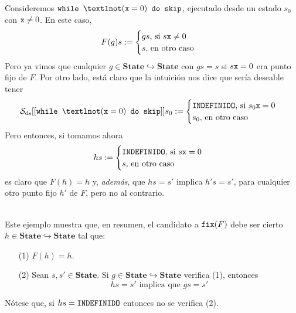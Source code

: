 \begin{example}
Consideremos $\n{while } ¬(\n{x}=0)\n{ do skip}$, ejecutado desde un estado $s_0$ con $\texttt{x}\neq 0$. En este caso, 
$$F(g)s := \begin{cases}
    gs \text{, si } s\texttt{x} \neq 0\\
    s \text{, en otro caso}
\end{cases}$$
Pero ya vimos que cualquier $g \in \mathbf{State}\hookrightarrow\mathbf{State}$ con $gs = s$ si $s\texttt{x} = 0$ era punto fijo de $F$. Por otro lado, está claro que la intuición nos dice que sería deseable tener
$$\mc{S}_\nn{ds}[[\n{while } ¬(\n{x}=0)\n{ do skip}]]s_0 := \begin{cases}
    \n{INDEFINIDO} \text{, si } s_0\n{x} = 0 \\
    s_0 \text{, en otro caso}
\end{cases}$$
Pero entonces, si tomamos ahora
$$hs := \begin{cases}
    \texttt{INDEFINIDO} \text{, si } s\texttt{x} = 0 \\
    s \text{, en otro caso}
\end{cases}$$
es claro que $F(h) = h$ y, \textit{además}, que $hs = s'$ implica $h's = s'$, para cualquier otro punto fijo $h'$ de $F$, pero no al contrario. 
\end{example}
\\
Este ejemplo muestra que, en resumen, el candidato a $\texttt{fix}(F)$ debe ser cierto $h \in \mathbf{State}\hookrightarrow\mathbf{State}$ tal que:
\begin{itemize}
    \item[(1)] $F(h)=h$.
    \item[(2)] Sean $s, s' \in \mathbf{State}$. Si $g \in \mathbf{State}\hookrightarrow\mathbf{State}$ verifica (1), entonces
    $$hs =s' \text{ implica que } gs=s'$$
\end{itemize}
Nótese que, si $hs = \texttt{INDEFINIDO}$ entonces no se verifica (2). 


